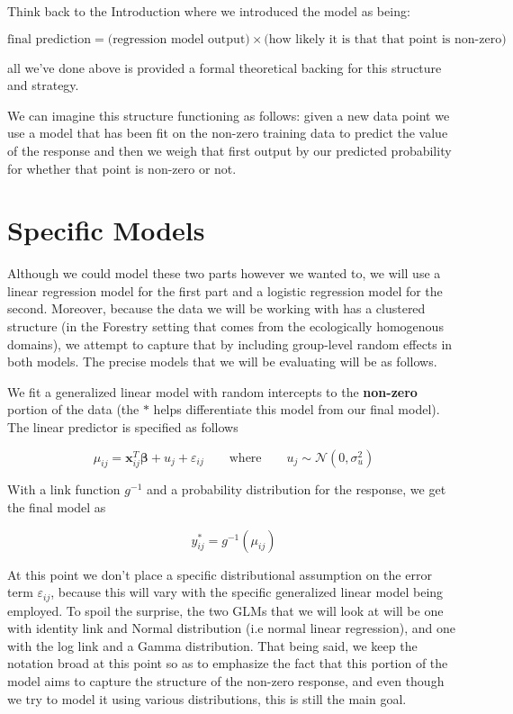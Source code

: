 \documentclass[12pt,twoside]{reedthesis}
\begin{document}
Think back to the Introduction where we introduced the model as being:

\[
\text{final prediction} = \bigg(\text{regression model output}\bigg) \times \bigg(\text{how likely it is that that point is non-zero}\bigg)
\]

all we've done above is provided a formal theoretical backing for this structure and strategy.

We can imagine this structure functioning as follows: given a new data point we use a model that has been fit on the non-zero training data to predict the value of the response and then we weigh that first output by our predicted probability for whether that point is non-zero or not.

\hypertarget{specific-models}{%
\section{Specific Models}\label{specific-models}}

Although we could model these two parts however we wanted to, we will use a linear regression model for the first part and a logistic regression model for the second. Moreover, because the data we will be working with has a clustered structure (in the Forestry setting that comes from the ecologically homogenous domains), we attempt to capture that by including group-level random effects in both models. The precise models that we will be evaluating will be as follows.

We fit a generalized linear model with random intercepts to the \textbf{non-zero} portion of the data (the \(*\) helps differentiate this model from our final model). The linear predictor is specified as follows

\[
\mu_{ij} = \mathbf{x}_{ij}^T\boldsymbol{\beta} + u_j + \varepsilon_{ij} \qquad \text{where} \qquad u_j \sim \mathcal{N}(0, \sigma_u^2)
\]

With a link function \(g^{-1}\) and a probability distribution for the response, we get the final model as

\[
y^*_{ij} = g^{-1}(\mu_{ij})
\]

At this point we don't place a specific distributional assumption on the error term \(\varepsilon_{ij}\), because this will vary with the specific generalized linear model being employed. To spoil the surprise, the two GLMs that we will look at will be one with identity link and Normal distribution (i.e normal linear regression), and one with the log link and a Gamma distribution. That being said, we keep the notation broad at this point so as to emphasize the fact that this portion of the model aims to capture the structure of the non-zero response, and even though we try to model it using various distributions, this is still the main goal.
\end{document}
